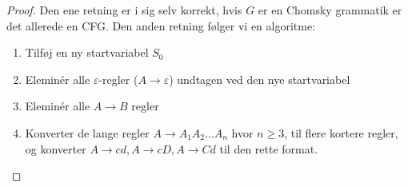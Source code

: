 \begin{proof}
	Den ene retning er i sig selv korrekt, hvis $G$ er en Chomsky grammatik er det allerede en CFG. Den anden retning følger vi en algoritme:
	\begin{enumerate}
		\item Tilføj en ny startvariabel $S_{0}$
		\item Eleminér alle \(\varepsilon\)-regler ($A\rightarrow\varepsilon$) undtagen ved den nye startvariabel
		\item Eleminér alle $A \rightarrow B$ regler
		\item Konverter de lange regler $A \rightarrow A_{1}A_2 \ldots A_{n}$ hvor $n \ge 3$, til flere kortere regler, og konverter $A \rightarrow cd, A \rightarrow cD, A \rightarrow Cd$ til den rette format.
	\end{enumerate}


\end{proof}
